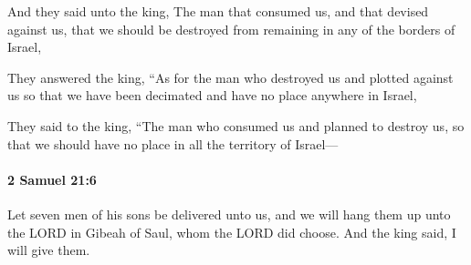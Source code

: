 			\begin{versebox}
					\item[BHS] 
					\item[ASV] And they said unto the king, The man that consumed us, and that devised against us, that we should be destroyed from remaining in any of the borders of Israel,
					\item[NIV] They answered the king, “As for the man who destroyed us and plotted against us so that we have been decimated and have no place anywhere in Israel,
					\item[NRSV] They said to the king, “The man who consumed us and planned to destroy us, so that we should have no place in all the territory of Israel—
			\end{versebox}

		\paragraph{2 Samuel 21:6} %
			\label{2SAMUEL-21-6}

			Let seven men of his sons be delivered unto us, and we will hang them up unto the LORD in Gibeah of Saul, whom the LORD did choose. And the king said, I will give them.

